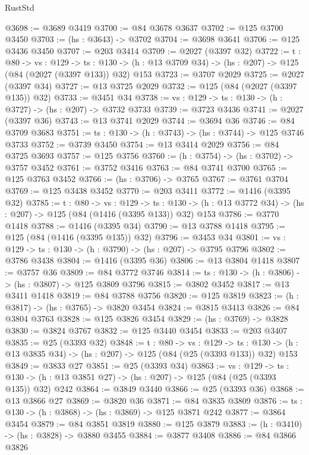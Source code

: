 \begin{lexlean}{RustStd}
\begin{coremodule}
{\begin{coremodule}
{{{{{{{{{{{{{{{@3698 := @3689 @3419
@3700 := @84 @3678 @3637
@3702 := @125 @3700 @3450
@3703 := (hs : @3643) -> @3702
@3704 := @3698 @3641
@3706 := @125 @3436 @3450
@3707 := @203 @3414
@3709 := @2027 (@3397 @32)
@3722 := {t : @80} ->
  {vs : @129} ->
  {ts : @130} -> (h : @13 @3709 @34) -> (hs : @207) -> @125 (@84 (@2027 (@3397 @133)) @32) @153
@3723 := @3707 @2029
@3725 := @2027 (@3397 @34)
@3727 := @13 @3725 @2029
@3732 := @125 (@84 (@2027 (@3397 @135)) @32)
@3733 := @3451 @34
@3738 := {vs : @129} -> {ts : @130} -> (h : @3727) -> (hs : @207) -> @3732 @3733
@3739 := @3723 @3436
@3741 := @2027 (@3397 @36)
@3743 := @13 @3741 @2029
@3744 := @3694 @36
@3746 := @84 @3709 @3683
@3751 := {ts : @130} -> (h : @3743) -> (hs : @3744) -> @125 @3746 @3733
@3752 := @3739 @3450
@3754 := @13 @3414 @2029
@3756 := @84 @3725 @3693
@3757 := @125 @3756
@3760 := (h : @3754) -> (hs : @3702) -> @3757 @3452
@3761 := @3752 @3416
@3763 := @84 @3741 @3700
@3765 := @125 @3763 @3452
@3766 := (hs : @3706) -> @3765
@3767 := @3761 @3704
@3769 := @125 @3438 @3452
@3770 := @203 @3411
@3772 := @1416 (@3395 @32)
@3785 := {t : @80} ->
  {vs : @129} ->
  {ts : @130} -> (h : @13 @3772 @34) -> (hs : @207) -> @125 (@84 (@1416 (@3395 @133)) @32) @153
@3786 := @3770 @1418
@3788 := @1416 (@3395 @34)
@3790 := @13 @3788 @1418
@3795 := @125 (@84 (@1416 (@3395 @135)) @32)
@3796 := @3453 @34
@3801 := {vs : @129} -> {ts : @130} -> (h : @3790) -> (hs : @207) -> @3795 @3796
@3802 := @3786 @3438
@3804 := @1416 (@3395 @36)
@3806 := @13 @3804 @1418
@3807 := @3757 @36
@3809 := @84 @3772 @3746
@3814 := {ts : @130} -> (h : @3806) -> (hs : @3807) -> @125 @3809 @3796
@3815 := @3802 @3452
@3817 := @13 @3411 @1418
@3819 := @84 @3788 @3756
@3820 := @125 @3819
@3823 := (h : @3817) -> (hs : @3765) -> @3820 @3454
@3824 := @3815 @3413
@3826 := @84 @3804 @3763
@3828 := @125 @3826 @3454
@3829 := (hs : @3769) -> @3828
@3830 := @3824 @3767
@3832 := @125 @3440 @3454
@3833 := @203 @3407
@3835 := @25 (@3393 @32)
@3848 := {t : @80} ->
  {vs : @129} ->
  {ts : @130} -> (h : @13 @3835 @34) -> (hs : @207) -> @125 (@84 (@25 (@3393 @133)) @32) @153
@3849 := @3833 @27
@3851 := @25 (@3393 @34)
@3863 := {vs : @129} ->
  {ts : @130} -> (h : @13 @3851 @27) -> (hs : @207) -> @125 (@84 (@25 (@3393 @135)) @32) @242
@3864 := @3849 @3440
@3866 := @25 (@3393 @36)
@3868 := @13 @3866 @27
@3869 := @3820 @36
@3871 := @84 @3835 @3809
@3876 := {ts : @130} -> (h : @3868) -> (hs : @3869) -> @125 @3871 @242
@3877 := @3864 @3454
@3879 := @84 @3851 @3819
@3880 := @125 @3879
@3883 := (h : @3410) -> (hs : @3828) -> @3880 @3455
@3884 := @3877 @3408
@3886 := @84 @3866 @3826
}}}}}}}}}}}}}}}
\end{coremodule}}
\end{coremodule}
\end{lexlean}
